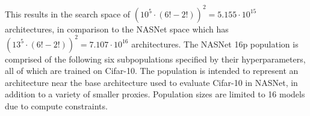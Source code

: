 \documentclass[twocolumn]{article}
\begin{document}
This results in the search space of $(10^{5}\cdot(6! - 2!))^{2} = 5.155\cdot10^{15}$ architectures, in comparison to the NASNet space which
has $(13^{5}\cdot(6! - 2!))^{2} = 7.107\cdot10^{16}$ architectures.
The NASNet 16p population is comprised of the following six subpopulations specified by their hyperparameters, all of which are trained on Cifar-10.
The population is intended to represent an architecture near the base architecture used to evaluate Cifar-10 in NASNet, in addition to a variety of smaller
proxies. Population sizes are limited to 16 models due to compute constraints.

\begin{table}[!h]
    \begin{center}
        \caption{NASNet Subpopulation Configurations}
        \label{table:nasnet_details}
    \end{center}
\end{table}
\end{document}
